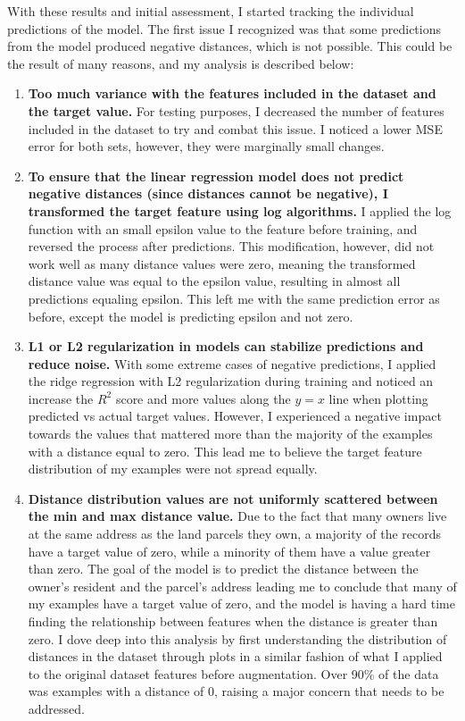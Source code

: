 With these results and initial assessment, I started tracking the individual predictions of the model. The first issue I recognized was that some predictions from the model produced negative distances, which is not possible. This could be the result of many reasons, and my analysis is described below:
\begin{enumerate}
    \item \textbf{Too much variance with the features included in the dataset and the target value.} For testing purposes, I decreased the number of features included in the dataset to try and combat this issue. I noticed a lower MSE error for both sets, however, they were marginally small changes.
    \item \textbf{To ensure that the linear regression model does not predict negative distances (since distances cannot be negative), I transformed the target feature using log algorithms.} I applied the log function with an small epsilon value to the feature before training, and reversed the process after predictions. This modification, however, did not work well as many distance values were zero, meaning the transformed distance value was equal to the epsilon value, resulting in almost all predictions equaling epsilon. This left me with the same prediction error as before, except the model is predicting epsilon and not zero.
    \item \textbf{L1 or L2 regularization in models can stabilize predictions and reduce noise.} With some extreme cases of negative predictions, I applied the ridge regression with L2 regularization during training and noticed an increase the $R^2$ score and more values along the $y=x$ line when plotting predicted vs actual target values. However, I experienced a negative impact towards the values that mattered more than the majority of the examples with a distance equal to zero. This lead me to believe the target feature distribution of my examples were not spread equally.
    \item \textbf{Distance distribution values are not uniformly scattered between the min and max distance value.} Due to the fact that many owners live at the same address as the land parcels they own, a majority of the records have a target value of zero, while a minority of them have a value greater than zero. The goal of the model is to predict the distance between the owner's resident and the parcel's address leading me to conclude that many of my examples have a target value of zero, and the model is having a hard time finding the relationship between features when the distance is greater than zero. I dove deep into this analysis by first understanding the distribution of distances in the dataset through plots in a similar fashion of what I applied to the original dataset features before augmentation. Over 90\% of the data was examples with a distance of 0, raising a major concern that needs to be addressed. 

\end{enumerate}
